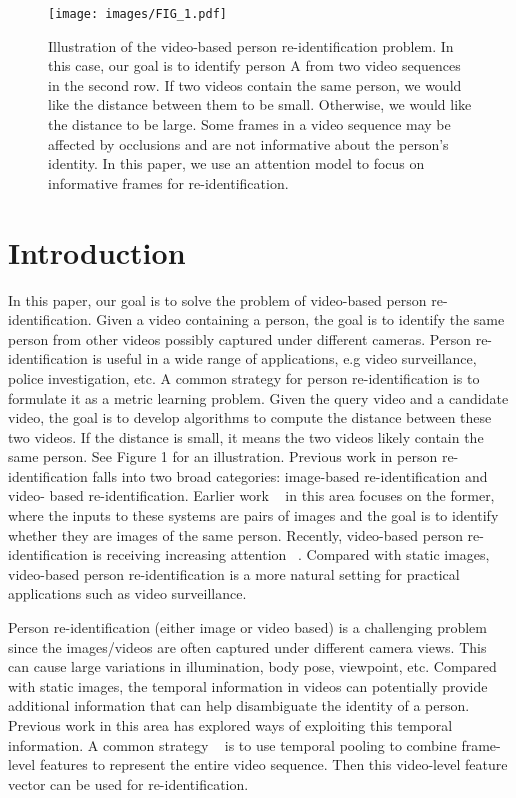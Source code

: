 \documentclass[sigconf, authordraft,review=false]{acmart}
\begin{document}
\begin{figure*}
\texttt{[image: images/FIG\_1.pdf]}
\caption{Illustration of the video-based person re-identification problem.  In this case, our goal is to identify person A from two video
sequences in the second row.  If two videos contain the same person, we would like the distance between them to be small.  Otherwise,
we would like the distance to be large. Some frames in a video sequence may be affected by occlusions and are not informative about the
person\textup{'}s identity. In this paper, we use an attention model to focus on informative frames for re-identification.}
\end{figure*}\section{Introduction}
In this paper, our goal is to solve the problem of video-based person re-identification.  Given a video containing a person, the goal is to identify the same person from other videos possibly captured under different cameras.  Person re-identification is useful in a wide range of applications,
e.g video surveillance, police investigation, etc. A common strategy for person re-identification is to formulate it as a metric learning problem.  Given the query video and a candidate video, the goal is to develop algorithms to compute the distance between these two videos.   If the distance is small, it means the two videos likely contain the same person. See Figure 1 for an illustration. Previous work in person re-identification falls into two broad categories: image-based re-identification and video-
based re-identification. Earlier work ~\cite{liao15_iccv,qian17_iccv,ustinova17_avss,varior16_eccv,
xiao16_cvpr,yi14_icpr,zhangL16_cvpr,zhengL15_iccv} in this area focuses on the former, where the inputs to these systems are pairs of images and the goal is  to  identify  whether  they  are  images  of  the  same  person.   Recently,  video-based  person  re-identification  is  receiving  increasing  attention ~\cite{li17_workshop,liu15_iccv,mclaughlin16_cvpr,wang14_eccv,
xu17_iccv,zhou17_cvpr,zhu16_ijcai}. Compared with static images, video-based person re-identification is a more natural setting for practical applications such as video surveillance. 

Person re-identification (either image or video based) is a challenging problem since the images/videos are often captured under different camera views. This can cause large variations in illumination, body pose, viewpoint, etc. Compared with static images, the temporal information in videos can potentially provide additional information that can help
disambiguate the identity of a person. Previous work in this area has explored ways of exploiting this temporal information. A common strategy ~\cite{mclaughlin16_cvpr,xu17_iccv,zhou17_cvpr} is to use temporal pooling to combine frame-level features to represent the entire video sequence.  Then this video-level feature vector
can be used for re-identification.
\end{document}
